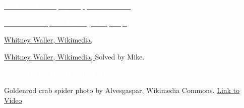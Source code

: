 \documentclass[t]{beamer}
\begin{document}
{
\begin{frame}[t]

\vfilll

\tiny \href{https://pixnio.com/people/crowd/silhouette-audience-crowd-concert-music-people-music-stage-performance}{\textcolor{white}{Author unknown, Pixnio, public domain.}}
\end{frame}
}

%

{
	\begin{frame}[t]
		
		\tinyfill \href{https://hechingerreport.org/will-giving-greater-student-access-smartphones-improve-learning/}{\textcolor{white}{Paul Barnwell, The Hechinger Report, .}}
	\end{frame}
}

%


{
\begin{frame}[t,plain]

\vfilll
\tiny \href{https://commons.wikimedia.org/wiki/File:Connect_the_dots_puzzle.jpg}{Whitney Waller, Wikimedia, }
\end{frame}
}

%

{
\begin{frame}[t,plain]
\vfilll
\tiny \href{https://commons.wikimedia.org/wiki/File:Connect_the_dots_puzzle.jpg}{Whitney Waller, Wikimedia, } \hfill Solved by Mike.
\end{frame}
}

%

{
\begin{frame}[b,plain]
	\tinyfill \textcolor{white}{Sunflowers by Trey Ratcliff, Flickr, Creative Commons.}
\end{frame}
}

%

{
\begin{frame}[b,plain]
\tiny Goldenrod crab spider photo by Alvesgaspar, Wikimedia Commons.\hfill
\textcolor{white}{\href{https://www.youtube.com/watch?v=O9B_9XxZKJ8}{Link to Video}}
\end{frame}
}
\end{document}
